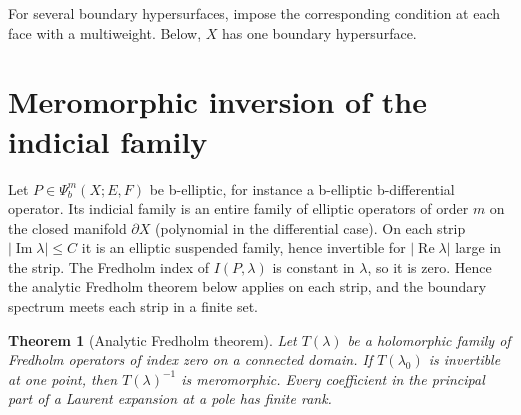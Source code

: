 \documentclass[12pt,oneside,reqno]{article}
\theoremstyle{plain}
\newtheorem{theorem}{Theorem}[section]
\theoremstyle{definition}
\theoremstyle{remark}
\begin{document}
For several boundary hypersurfaces, impose the corresponding condition at
each face with a multiweight. Below, \(X\) has one boundary hypersurface.

\section{Meromorphic inversion of the indicial family}

Let \(P\in\Psi_b^m(X;E,F)\) be b-elliptic, for instance a b-elliptic
b-differential operator. Its indicial family is an entire family of
elliptic operators of order \(m\) on the closed manifold \(\partial X\)
(polynomial in the differential case). On each strip
\(|\operatorname{Im}\lambda|\leq C\) it is an elliptic suspended family,
hence invertible for \(|\operatorname{Re}\lambda|\) large in the strip.
The Fredholm index of \(I(P,\lambda)\) is constant in \(\lambda\), so it is
zero. Hence the analytic Fredholm theorem below applies on each strip,
and the boundary spectrum meets each strip in a finite set.

\begin{theorem}[Analytic Fredholm theorem]
Let \(T(\lambda)\) be a holomorphic family of Fredholm operators of index
zero on a connected domain. If \(T(\lambda_0)\) is invertible at one point,
then \(T(\lambda)^{-1}\) is meromorphic. Every coefficient in the principal
part of a Laurent expansion at a pole has finite rank.
\end{theorem}
\end{document}
